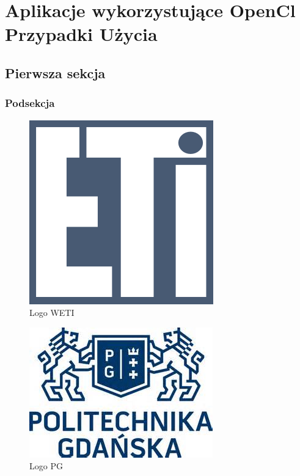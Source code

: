\section[Aplikacje wykorzystujące OpenCl Przypadki Użycia]{Aplikacje wykorzystujące OpenCl Przypadki Użycia}

\subsection[Pierwsza sekcja]{Pierwsza sekcja}
\subsubsection{Podsekcja}
\lipsum[6]

\begin{figure}[H]
	\includegraphics[scale=0.8]{imgs/eti.png}
	\caption{Logo WETI}
\end{figure}

\lipsum[3]

\begin{figure}[H]
	\includegraphics[scale=0.8]{imgs/pg.jpg}
	\caption{Logo PG}
\end{figure}

\lipsum[7]

